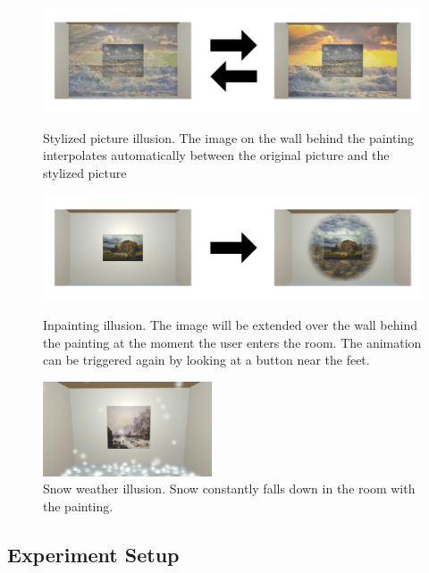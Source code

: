 \documentclass[a4paper]{article}
\begin{document}
\begin{figure}
\centering
\includegraphics[width=12cm]{StylizedExample}
\caption{Stylized picture illusion. The image on the wall behind the painting interpolates automatically between the original picture and the stylized picture}
\label{fig:stylizedExample}

\includegraphics[width=12cm]{ExtendedExample}
\caption{Inpainting illusion. The image will be extended over the wall behind the painting at the moment the user enters the room. The animation can be triggered again by looking at a button near the feet.}
\label{fig:extendedExample}

\includegraphics[width=5cm]{WeatherExample}
\caption{Snow weather illusion. Snow constantly falls down in the room with the painting.}
\label{fig:weatherExample}
\end{figure}

\subsection{Experiment Setup}

\end{document}
